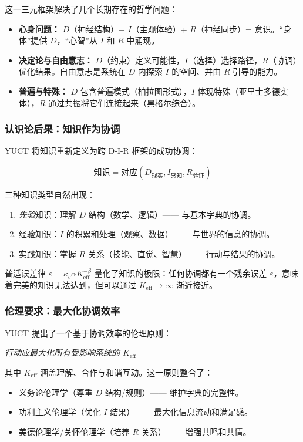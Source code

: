 \documentclass[12pt,a4paper]{article}
\newcommand{\eff}{\mathrm{eff}}
\newcommand{\Ke}{K_{\eff}}
\begin{document}
		这一三元框架解决了几个长期存在的哲学问题：
		
		\begin{itemize}
		\item \textbf{心身问题：} $D$（神经结构）+ $I$（主观体验）+ $R$（神经同步）= 意识。“身体”提供 $D$，“心智”从 $I$ 和 $R$ 中涌现。
		\item \textbf{决定论与自由意志：} $D$（约束）定义可能性，$I$（选择）选择路径，$R$（协调）优化结果。自由意志是系统在 $D$ 内探索 $I$ 的空间、并由 $R$ 引导的能力。
		\item \textbf{普遍与特殊：} $D$ 包含普遍模式（柏拉图形式），$I$ 体现特殊（亚里士多德实体），$R$ 通过共振将它们连接起来（黑格尔综合）。
		\end{itemize}
		
		\subsubsection{认识论后果：知识作为协调}
		
		YUCT 将知识重新定义为跨 D-I-R 框架的成功协调：
		
		\[
		\text{知识} = \text{对应}(D_{\text{现实}}, I_{\text{感知}}, R_{\text{验证}})
		\]
		
		三种知识类型自然出现：
		\begin{enumerate}
		\item \textit{先验}知识：理解 $D$ 结构（数学、逻辑）—— 与基本字典的协调。
		\item 经验知识：$I$ 的积累和处理（观察、数据）—— 与世界的信息的协调。
		\item 实践知识：掌握 $R$ 关系（技能、直觉、智慧）—— 行动与结果的协调。
		\end{enumerate}
		
		普适误差律 $\varepsilon = \kappa_c \alpha \Ke^{-\beta}$ 量化了知识的极限：任何协调都有一个残余误差 $\varepsilon$，意味着完美的知识无法达到，但可以通过 $\Ke \to \infty$ 渐近接近。
		
		\subsubsection{伦理要求：最大化协调效率}
		
		YUCT 提出了一个基于协调效率的伦理原则：
		
		\begin{center}
		\textit{行动应最大化所有受影响系统的 $\Ke$}
		\end{center}
		
		其中 $\Ke$ 涵盖理解、合作与和谐互动。这一原则整合了：
		\begin{itemize}
		\item 义务论伦理学（尊重 $D$ 结构/规则）—— 维护字典的完整性。
		\item 功利主义伦理学（优化 $I$ 结果）—— 最大化信息流动和满足感。
		\item 美德伦理学/关怀伦理学（培养 $R$ 关系）—— 增强共鸣和共情。
		\end{itemize}
		
\end{document}
